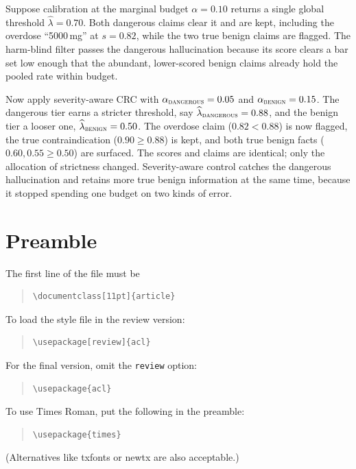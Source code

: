 \documentclass[11pt]{article}
\begin{document}
Suppose calibration at the marginal budget $\alpha = 0.10$ returns a single global
threshold $\widehat{\lambda} = 0.70$. Both dangerous claims clear it and are kept,
including the overdose ``5000\,mg'' at $s = 0.82$, while the two true benign claims
are flagged. The harm-blind filter passes the dangerous hallucination because its
score clears a bar set low enough that the abundant, lower-scored benign claims
already hold the pooled rate within budget.

Now apply severity-aware CRC with $\alpha_{\textsc{dangerous}} = 0.05$ and
$\alpha_{\textsc{benign}} = 0.15$. The dangerous tier earns a stricter threshold,
say $\widehat{\lambda}_{\textsc{dangerous}} = 0.88$, and the benign tier a looser
one, $\widehat{\lambda}_{\textsc{benign}} = 0.50$. The overdose claim
($0.82 < 0.88$) is now flagged, the true contraindication ($0.90 \ge 0.88$) is
kept, and both true benign facts ($0.60, 0.55 \ge 0.50$) are surfaced. The scores
and claims are identical; only the allocation of strictness changed. Severity-aware
control catches the dangerous hallucination and retains more true benign
information at the same time, because it stopped spending one budget on two kinds
of error.


\section{Preamble}

The first line of the file must be
\begin{quote}
\begin{verbatim}
\documentclass[11pt]{article}
\end{verbatim}
\end{quote}

To load the style file in the review version:
\begin{quote}
\begin{verbatim}
\usepackage[review]{acl}
\end{verbatim}
\end{quote}
For the final version, omit the \verb|review| option:
\begin{quote}
\begin{verbatim}
\usepackage{acl}
\end{verbatim}
\end{quote}

To use Times Roman, put the following in the preamble:
\begin{quote}
\begin{verbatim}
\usepackage{times}
\end{verbatim}
\end{quote}
(Alternatives like txfonts or newtx are also acceptable.)
\end{document}
